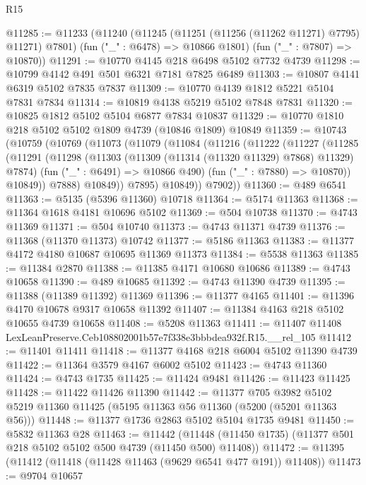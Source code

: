 \begin{lexlean}{R15}
\begin{coremodule}
{{{{{{{{{{{@11285 := @11233
    (@11240
      (@11245 (@11251 (@11256 (@11262 @11271) @7795) @11271) @7801)
      (fun ("_" : @6478) => @10866 @1801)
      (fun ("_" : @7807) => @10870))
@11291 := @10770 @4145 @218 @6498 @5102 @7732 @4739
@11298 := @10799 @4142 @491 @501 @6321 @7181 @7825 @6489
@11303 := @10807 @4141 @6319 @5102 @7835 @7837
@11309 := @10770 @4139 @1812 @5221 @5104 @7831 @7834
@11314 := @10819 @4138 @5219 @5102 @7848 @7831
@11320 := @10825 @1812 @5102 @5104 @6877 @7834 @10837
@11329 := @10770 @1810 @218 @5102 @5102 @1809 @4739 (@10846 @1809) @10849
@11359 := @10743
    (@10759
      (@10769
        (@11073
          (@11079
            (@11084
              (@11216
                (@11222
                  (@11227
                    (@11285
                      (@11291
                        (@11298
                          (@11303 (@11309 (@11314 (@11320 @11329) @7868) @11329) @7874)
                          (fun ("_" : @6491) => @10866 @490)
                          (fun ("_" : @7880) => @10870))
                        @10849))
                    @7888)
                  @10849))
              @7895)
            @10849))
        @7902))
@11360 := @489 @6541
@11363 := @5135 (@5396 @11360) @10718
@11364 := @5174 @11363
@11368 := @11364 @1618 @4181 @10696 @5102
@11369 := @504 @10738
@11370 := @4743 @11369
@11371 := @504 @10740
@11373 := @4743 @11371 @4739
@11376 := @11368 (@11370 @11373) @10742
@11377 := @5186 @11363
@11383 := @11377 @4172 @4180 @10687 @10695 @11369 @11373
@11384 := @5538 @11363
@11385 := @11384 @2870
@11388 := @11385 @4171 @10680 @10686
@11389 := @4743 @10658
@11390 := @489 @10685
@11392 := @4743 @11390 @4739
@11395 := @11388 (@11389 @11392) @11369
@11396 := @11377 @4165
@11401 := @11396 @4170 @10678 @9317 @10658 @11392
@11407 := @11384 @4163 @218 @5102 @10655 @4739 @10658
@11408 := @5208 @11363
@11411 := @11407 @11408 LexLeanPreserve.Ceb108802001b57e7f338e3bbbdea932f.R15.__rel_105
@11412 := @11401 @11411
@11418 := @11377 @4168 @218 @6004 @5102 @11390 @4739
@11422 := @11364 @3579 @4167 @6002 @5102
@11423 := @4743 @11360
@11424 := @4743 @1735
@11425 := @11424 @9481
@11426 := @11423 @11425
@11428 := @11422 @11426 @11390
@11442 := @11377
    @705
    @3982
    @5102
    @5219
    @11360
    @11425
    (@5195 @11363 @56 @11360 (@5200 (@5201 @11363 @56)))
@11448 := @11377 @1736 @2863 @5102 @5104 @1735 @9481
@11450 := @5832 @11363 @28
@11463 := @11442
    (@11448 (@11450 @1735) (@11377 @501 @218 @5102 @5102 @500 @4739 (@11450 @500) @11408))
@11472 := @11395 (@11412 (@11418 (@11428 @11463 (@9629 @6541 @477 @191)) @11408))
@11473 := @9704 @10657
}}}}}}}}}}}
\end{coremodule}
\end{lexlean}
